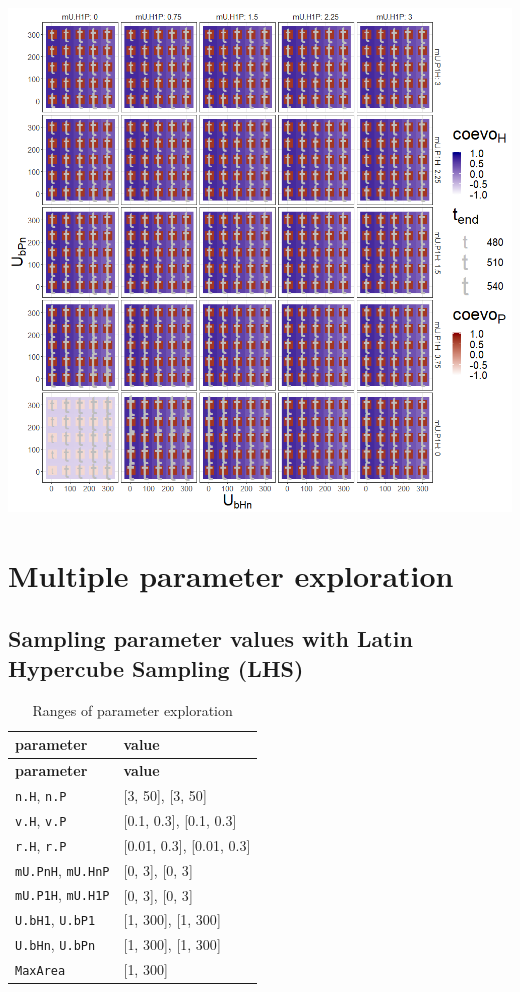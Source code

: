\documentclass[]{book}
\begin{document}
\newpage

\includegraphics[width=1\linewidth]{plots/4_fourPar-U.bn-mU1_plot}

\hypertarget{multiple-parameter-exploration}{%
\chapter{Multiple parameter exploration}\label{multiple-parameter-exploration}}

\newpage

\hypertarget{sampling-parameter-values-with-latin-hypercube-sampling-lhs}{%
\section{Sampling parameter values with Latin Hypercube Sampling (LHS)}\label{sampling-parameter-values-with-latin-hypercube-sampling-lhs}}

\begin{longtable}[]{@{}ll@{}}
\caption{Ranges of parameter exploration}\tabularnewline
\toprule
\textbf{parameter} & \textbf{value}\tabularnewline
\midrule
\endfirsthead
\toprule
\textbf{parameter} & \textbf{value}\tabularnewline
\midrule
\endhead
\texttt{n.H}, \texttt{n.P} & {[}3, 50{]}, {[}3, 50{]}\tabularnewline
\texttt{v.H}, \texttt{v.P} & {[}0.1, 0.3{]}, {[}0.1, 0.3{]}\tabularnewline
\texttt{r.H}, \texttt{r.P} & {[}0.01, 0.3{]}, {[}0.01, 0.3{]}\tabularnewline
\texttt{mU.PnH}, \texttt{mU.HnP} & {[}0, 3{]}, {[}0, 3{]}\tabularnewline
\texttt{mU.P1H}, \texttt{mU.H1P} & {[}0, 3{]}, {[}0, 3{]}\tabularnewline
\texttt{U.bH1}, \texttt{U.bP1} & {[}1, 300{]}, {[}1, 300{]}\tabularnewline
\texttt{U.bHn}, \texttt{U.bPn} & {[}1, 300{]}, {[}1, 300{]}\tabularnewline
\texttt{MaxArea} & {[}1, 300{]}\tabularnewline
\bottomrule
\end{longtable}
\end{document}
